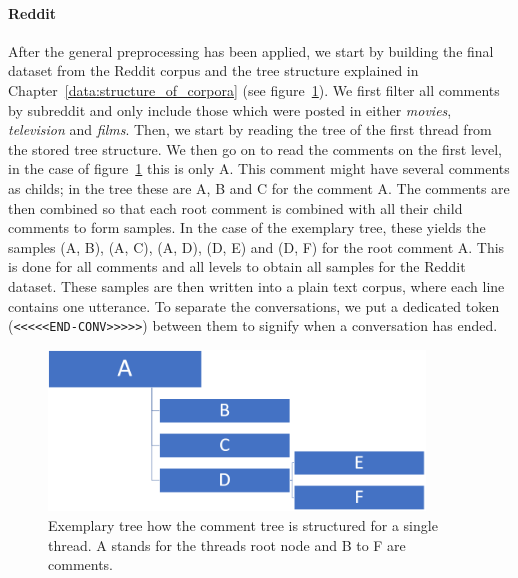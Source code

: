 \paragraph{Reddit} After the general preprocessing has been applied, we start by building the final dataset from the Reddit corpus and the tree structure explained in Chapter~\ref{data:structure_of_corpora} (see figure~\ref{fig:data:reddit:utterance:construction}). We first filter all comments by subreddit and only include those which were posted in either \emph{movies}, \emph{television} and \emph{films}. Then, we start by reading the tree of the first thread from the stored tree structure. We then go on to read the comments on the first level, in the case of figure~\ref{fig:data:reddit:utterance:construction} this is only A. This comment might have several comments as childs; in the tree these are A, B and C for the comment A. The comments are then combined so that each root comment is combined with all their child comments to form samples. In the case of the exemplary tree, these yields the samples (A, B), (A, C), (A, D), (D, E) and (D, F) for the root comment A. This is done for all comments and all levels to obtain all samples for the Reddit dataset. These samples are then written into a plain text corpus, where each line contains one utterance. To separate the conversations, we put a dedicated token (\texttt{<<<<<END-CONV>>>>>}) between them to signify when a conversation has ended.
\\
\begin{figure}[H]
	\centering
	\includegraphics[width=10cm]{img/reddit_utterance_construction.PNG}
	\caption{Exemplary tree how the comment tree is structured for a single thread. A stands for the threads root node and B to F are comments.}
	\label{fig:data:reddit:utterance:construction}
\end{figure}

